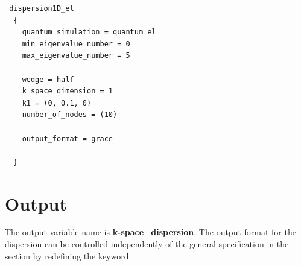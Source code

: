 \begin{verbatim}
 dispersion1D_el
  {
    quantum_simulation = quantum_el
    min_eigenvalue_number = 0
    max_eigenvalue_number = 5

    wedge = half
    k_space_dimension = 1
    k1 = (0, 0.1, 0)
    number_of_nodes = (10)

    output_format = grace
    
  }
\end{verbatim}

\section{Output}
The output variable name is \textbf{k-space\_dispersion}.
The output format for the dispersion can be controlled independently of the general specification in the \Simulation{} section by redefining the  keyword.


